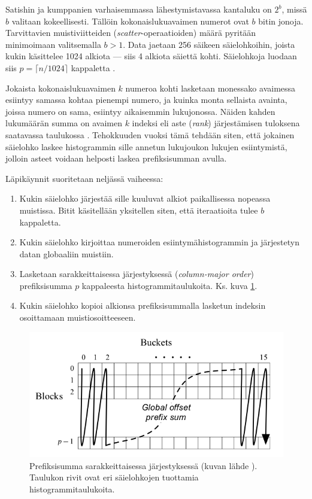 \documentclass[a4paper,11pt]{article}
\newcommand{\engl}[1]{\foreignlanguage{english}{\em #1}}
\begin{document}
Satishin ja kumppanien \cite{satish2009} varhaisemmassa lähestymistavassa kantaluku on $2^b$, missä $b$ valitaan kokeellisesti. Tällöin kokonaislukuavaimen numerot ovat $b$ bitin jonoja. Tarvittavien muistiviitteiden (\engl{scatter}-operaatioiden) määrä pyritään minimoimaan valitsemalla $b > 1$. Data jaetaan 256 säikeen säielohkoihin, joista kukin käsittelee 1024 alkiota --- siis 4 alkiota säiettä kohti. Säielohkoja luodaan siis $p = \lceil n/1024 \rceil$ kappaletta \cite{satish2009}.

Jokaista kokonaislukuavaimen $k$ numeroa kohti lasketaan monessako avaimessa esiintyy samassa kohtaa pienempi numero, ja kuinka monta sellaista avainta, joissa numero on sama, esiintyy aikaisemmin lukujonossa. Näiden kahden lukumäärän summa on avaimen $k$ indeksi eli aste (\engl{rank}) järjestämisen tuloksena saatavassa taulukossa \cite{satish2009}. Tehokkuuden vuoksi tämä tehdään siten, että jokainen säielohko laskee histogrammin sille annetun lukujoukon lukujen esiintymistä, jolloin asteet voidaan helposti laskea prefiksisumman avulla.

Läpikäynnit suoritetaan neljässä vaiheessa:
\singlespacing
\begin{enumerate}
\item Kukin säielohko järjestää sille kuuluvat alkiot paikallisessa nopeassa muistissa. Bitit käsitellään yksitellen siten, että iteraatioita tulee $b$ kappaletta.
\item Kukin säielohko kirjoittaa numeroiden esiintymähistogrammin ja järjestetyn datan globaaliin muistiin.
\item Lasketaan sarakkeittaisessa järjestyksessä (\engl{column-major order}) prefiksisumma $p$ kappaleesta histogrammitaulukoita. Ks. kuva \ref{fig:columnscan}.
\item Kukin säielohko kopioi alkionsa prefiksisummalla lasketun indeksin osoittamaan muistiosoitteeseen.
\end{enumerate}
\onehalfspacing

\begin{figure}
\centering
\includegraphics[scale = 0.5]{prefixsum}
\caption{Prefiksisumma sarakkeittaisessa järjestyksessä (kuvan lähde \cite{satish2009}). Taulukon rivit ovat eri säielohkojen tuottamia histogrammitaulukoita.}
\label{fig:columnscan}
\end{figure}
\end{document}
